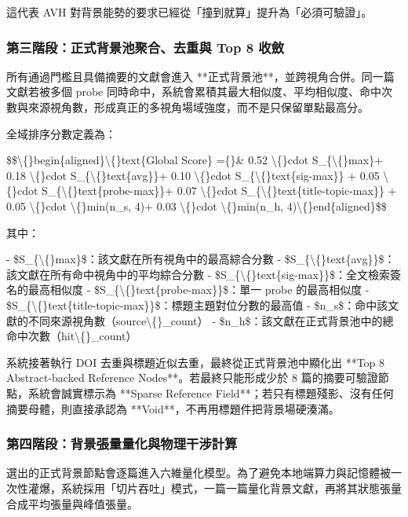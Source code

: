 \documentclass{article}
\begin{document}
這代表 AVH 對背景能勢的要求已經從「撞到就算」提升為「必須可驗證」。

\subsubsection{第三階段：正式背景池聚合、去重與 Top 8 收斂}

所有通過門檻且具備摘要的文獻會進入 **正式背景池**，並跨視角合併。同一篇文獻若被多個 probe 同時命中，系統會累積其最大相似度、平均相似度、命中次數與來源視角數，形成真正的多視角場域強度，而不是只保留單點最高分。

全域排序分數定義為：

\$\$\textbackslash\{\}begin\{aligned\}\textbackslash\{\}text\{Global Score\} =\{\}\& 0.52 \textbackslash\{\}cdot S\_\{\textbackslash\{\}max\}+ 0.18 \textbackslash\{\}cdot S\_\{\textbackslash\{\}text\{avg\}\}+ 0.10 \textbackslash\{\}cdot S\_\{\textbackslash\{\}text\{sig-max\}\} + 0.05 \textbackslash\{\}cdot S\_\{\textbackslash\{\}text\{probe-max\}\}+ 0.07 \textbackslash\{\}cdot S\_\{\textbackslash\{\}text\{title-topic-max\}\} + 0.05 \textbackslash\{\}cdot \textbackslash\{\}min(n\_s, 4)+ 0.03 \textbackslash\{\}cdot \textbackslash\{\}min(n\_h, 4)\textbackslash\{\}end\{aligned\}\$\$

其中：

- \$S\_\{\textbackslash\{\}max\}\$：該文獻在所有視角中的最高綜合分數  
- \$S\_\{\textbackslash\{\}text\{avg\}\}\$：該文獻在所有命中視角中的平均綜合分數  
- \$S\_\{\textbackslash\{\}text\{sig-max\}\}\$：全文檢索簽名的最高相似度  
- \$S\_\{\textbackslash\{\}text\{probe-max\}\}\$：單一 probe 的最高相似度  
- \$S\_\{\textbackslash\{\}text\{title-topic-max\}\}\$：標題主題對位分數的最高值  
- \$n\_s\$：命中該文獻的不同來源視角數（source\textbackslash\{\}\_count）  
- \$n\_h\$：該文獻在正式背景池中的總命中次數（hit\textbackslash\{\}\_count）  


系統接著執行 DOI 去重與標題近似去重，最終從正式背景池中顯化出 **Top 8 Abstract-backed Reference Nodes**。若最終只能形成少於 8 篇的摘要可驗證節點，系統會誠實標示為 **Sparse Reference Field**；若只有標題殘影、沒有任何摘要母體，則直接承認為 **Void**，不再用標題件把背景場硬湊滿。

\subsubsection{第四階段：背景張量量化與物理干涉計算}

選出的正式背景節點會逐篇進入六維量化模型。為了避免本地端算力與記憶體被一次性灌爆，系統採用「切片吞吐」模式，一篇一篇量化背景文獻，再將其狀態張量合成平均張量與峰值張量。
\end{document}
